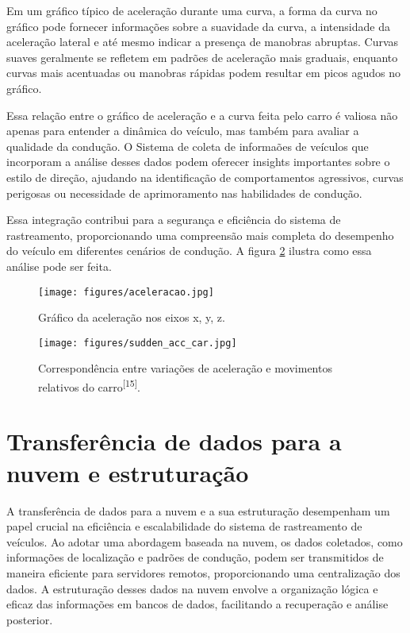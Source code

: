 Em um gráfico típico de aceleração durante uma curva, a forma da curva no gráfico pode fornecer informações sobre a suavidade da curva, a intensidade da aceleração lateral e até mesmo indicar a presença de manobras abruptas. Curvas suaves geralmente se refletem em padrões de aceleração mais graduais, enquanto curvas mais acentuadas ou manobras rápidas podem resultar em picos agudos no gráfico.

Essa relação entre o gráfico de aceleração e a curva feita pelo carro é valiosa não apenas para entender a dinâmica do veículo, mas também para avaliar a qualidade da condução. O Sistema de coleta de informaões de veículos que incorporam a análise desses dados podem oferecer insights importantes sobre o estilo de direção, ajudando na identificação de comportamentos agressivos, curvas perigosas ou necessidade de aprimoramento nas habilidades de condução. 

Essa integração contribui para a segurança e eficiência do sistema de rastreamento, proporcionando uma compreensão mais completa do desempenho do veículo em diferentes cenários de condução. A figura \ref{fig:sudden_acc_car} ilustra como essa análise pode ser feita.

\begin{figure}[hp]
    \centering
    
    \texttt{[image: figures/aceleracao.jpg]}
    
    \caption{Gráfico da aceleração nos eixos x, y, z.}
    
    \label{fig:aceleracao}
\end{figure}

\begin{figure}[hp]
    \centering
    
    \texttt{[image: figures/sudden\_acc\_car.jpg]}
    
    \caption{Correspondência entre variações de aceleração e movimentos relativos do carro\textsuperscript{[15]}.}
    
    \label{fig:sudden_acc_car}
\end{figure}

\section{Transferência de dados para a nuvem e estruturação}

A transferência de dados para a nuvem e a sua estruturação desempenham um papel crucial na eficiência e escalabilidade do sistema de rastreamento de veículos. Ao adotar uma abordagem baseada na nuvem, os dados coletados, como informações de localização e padrões de condução, podem ser transmitidos de maneira eficiente para servidores remotos, proporcionando uma centralização dos dados. A estruturação desses dados na nuvem envolve a organização lógica e eficaz das informações em bancos de dados, facilitando a recuperação e análise posterior. 

